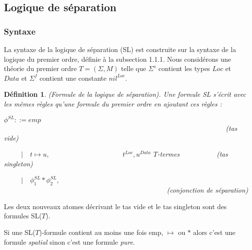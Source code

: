 \documentclass[11pt,openany]{article}
\newtheorem{definition}{D\'efinition}[subsection]
\begin{document}
	\subsection{Logique de s\'eparation}
		\subsubsection{Syntaxe}
	La syntaxe de la logique de s\'eparation (SL)\cite{OHearnRY01} est construite sur la syntaxe de la logique du premier ordre, d\'efinie \`a la subsection 1.1.1. Nous consid\'erons une th\'eorie du premier ordre $T=(\Sigma,M)$ telle que $\Sigma^{s}$ contient les types $Loc$ et $Data$ et $\Sigma^{f}$ contient une constante $nil^{Loc}$.
	\begin{definition}
	(Formule de la logique de s\'eparation). Une formule SL s'\'ecrit avec les m\^emes r\`egles qu'une formule du premier ordre en ajoutant ces r\`egles :
	
	$\phi^{SL} ::=  emp$~~~~~~~~~~~~~~~~~~~~~~~~~~~~~~~~~~~~~~~~~~~~~~~~~~~~~~~~~~~~~~~~(tas vide)
	
~~~~~$|$~~$t\mapsto u,$~~~~~~~~~~~~~~~~~~~~~$t^{Loc},u^{Data}$ $T$-termes ~~~~~~~~~~(tas singleton)


~~~~~$|$~~$\phi_{1}^{SL} * \phi_{2}^{SL},$~~~~~~~~~~~~~~~~~~~~~~~~~~~~~~~~~~~~~~~~~~~~~~~(conjonction de s\'eparation)

	\end{definition}
	
	Les deux nouveaux atomes d\'ecrivant le tas vide et le tas singleton sont des formules SL($T$).
	
	Si une SL($T$)-formule contient au moins une fois emp, $\mapsto$ ou $*$ alors c'est une formule \textit{spatial} sinon c'est une formule \textit{pure}.
	
\end{document}
